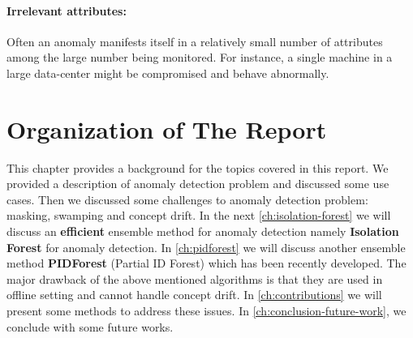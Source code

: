 \paragraph{Irrelevant attributes:}
Often an anomaly manifests itself in a relatively small number of attributes among the large number being monitored. 
For instance, a single machine in a large data-center might be compromised and behave abnormally.

\section{Organization of The Report}
\label{sec:organization-of-the-report}

This chapter provides a background for the topics covered in this report.
We provided a description of anomaly detection problem and discussed some use cases.
Then we discussed some challenges to anomaly detection problem: masking, swamping and concept drift.
In the next \cref{ch:isolation-forest} we will discuss an \textbf{efficient} ensemble method for anomaly detection namely \textbf{Isolation Forest} for anomaly detection.
In \cref{ch:pidforest} we will discuss another ensemble method \textbf
{PIDForest} (Partial ID Forest) which has been recently developed.
The major drawback of the above mentioned algorithms is that they are used in offline setting and cannot handle concept drift.
In \cref{ch:contributions} we will present some methods to address these issues. In \cref{ch:conclusion-future-work}, we conclude with some future works.